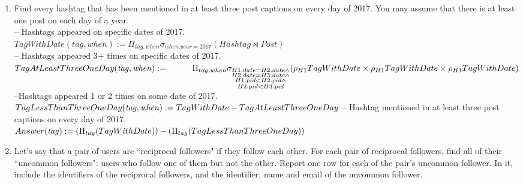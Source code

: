 \documentclass{article}
\newcommand{\var}[1]{\mathit{#1}}
\begin{document}
\begin{enumerate}
\item   %
Find every hashtag that has been mentioned in at least three post captions
on every day of 2017.
You may assume that there is at least one post on each day of a year. \\

{\large
-- Hashtags appeared on specific dates of 2017. \\[5pt]
$
TagWithDate(\var{tag, when}) := 
	\Pi_{tag, when}
	\sigma_{when.year = 2017}
	(Hashtag \bowtie Post)
$ \\[10pt]
-- Hashtags appeared 3+ times on specific dates of 2017. \\[5pt]
$
TagAtLeastThreeOneDay(\var{tag, when}) := \\[5pt]
	\hspace*{1cm}
	\Pi_{tag, when}
	\sigma_{\substack{H1.date=H2.date \wedge \\ H2.date=H3.date \wedge \\ H1.pid < H2.pid \wedge \\ H2.pid < H3.pid}}
	(\rho_{H1}TagWithDate \times \rho_{H1}TagWithDate \times \rho_{H1}TagWithDate) \\[10pt]
$
--Hashtags appeared 1 or 2 times on some date of 2017. \\[5pt]
$
TagLessThanThreeOneDay(\var{tag, when}) := 
	TagWithDate - TagAtLeastThreeOneDay \\[10pt]
$
-- Hashtag mentioned in at least three post captions on every day of 2017. \\[5pt]
$
Answer(\var{tag}) :=
	(\Pi_{tag} (TagWithDate)) - (\Pi_{tag} (TagLessThanThreeOneDay)) \\[10pt]
$
}

\item   %
Let's say that a pair of users are ``reciprocal followers" if they follow each other. 
For each pair of reciprocal followers, 
find all of their ``uncommon followers": 
users who follow one of them but not the other. 
Report one row for each of the pair's uncommon follower.
In it, include
the identifiers of the reciprocal followers,
and the identifier, name and email of the uncommon follower.\\


\end{enumerate}
\end{document}
